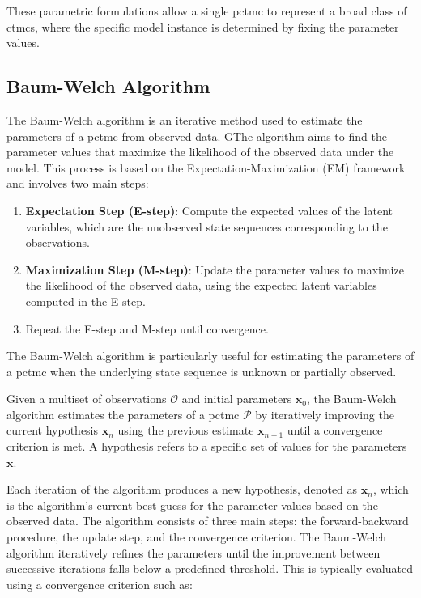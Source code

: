 These parametric formulations allow a single \gls{pctmc} to represent a broad class of \glspl{ctmc}, where the specific model instance is determined by fixing the parameter values.

\subsection{Baum-Welch Algorithm}\label{subsec:baum-welch}
The Baum-Welch algorithm is an iterative method used to estimate the parameters of a \gls{pctmc} from observed data.
GThe algorithm aims to find the parameter values that maximize the likelihood of the observed data under the model.
This process is based on the Expectation-Maximization (EM) framework and involves two main steps:

\begin{enumerate}
    \item \textbf{Expectation Step (E-step)}: Compute the expected values of the latent variables, which are the unobserved state sequences corresponding to the observations.
    \item \textbf{Maximization Step (M-step)}: Update the parameter values to maximize the likelihood of the observed data, using the expected latent variables computed in the E-step.
    \item Repeat the E-step and M-step until convergence.
\end{enumerate}

The Baum-Welch algorithm is particularly useful for estimating the parameters of a \gls{pctmc} when the underlying state sequence is unknown or partially observed.

Given a multiset of observations $\mathcal{O}$ and initial parameters $\textbf{x}_0$, the Baum-Welch algorithm estimates the parameters of a \gls{pctmc} $\mathcal{P}$ by iteratively improving the current hypothesis $\textbf{x}_n$ using the previous estimate $\textbf{x}_{n-1}$ until a convergence criterion is met.
A hypothesis refers to a specific set of values for the parameters $\mathbf{x}$.

Each iteration of the algorithm produces a new hypothesis, denoted as $\textbf{x}_n$, which is the algorithm's current best guess for the parameter values based on the observed data.
The algorithm consists of three main steps: the forward-backward procedure, the update step, and the convergence criterion.
The Baum-Welch algorithm iteratively refines the parameters until the improvement between successive iterations falls below a predefined threshold.
This is typically evaluated using a convergence criterion such as:

